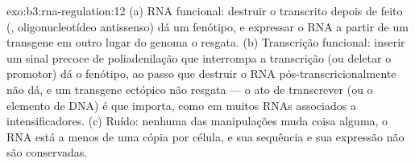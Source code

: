 \begin{solution}{exo:b3:rna-regulation:12}
(a) RNA funcional: destruir o transcrito depois de feito (,
oligonucleotídeo antissenso) dá um fenótipo, e expressar o RNA a partir
de um transgene em outro lugar do genoma o resgata. (b) Transcrição
funcional: inserir um sinal precoce de poliadenilação que interrompa a
transcrição (ou deletar o promotor) dá o fenótipo, ao passo que
destruir o RNA pós-transcricionalmente não dá, e um transgene ectópico
não resgata --- o ato de transcrever (ou o elemento de DNA) é que
importa, como em muitos RNAs associados a intensificadores. (c) Ruído:
nenhuma das manipulações muda coisa alguma, o RNA está a menos de uma
cópia por célula, e sua sequência e sua expressão não são conservadas.
\end{solution}

